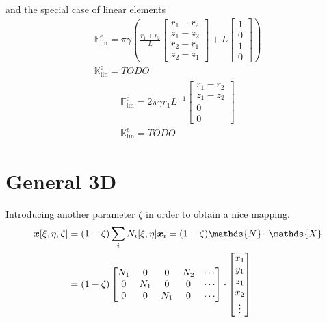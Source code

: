 \documentclass[a4paper,11pt]{article}
\renewcommand{\to}[1]{\text{\boldmath $#1$}} %
\newcommand{\uv}[1]{\mathds{#1}}
\newcommand{\um}[1]{\mathds{#1}}
\newcommand{\element}{\mathrm{e}}
\newcommand{\linear}{\mathrm{lin}}
\begin{document}
and the special case of linear elements
\begin{gather}
 \uv F^\element_\linear = \pi \gamma \left(\frac{r_1+r_2}{L}\begin{bmatrix}r_1-r_2\\z_1-z_2\\r_2-r_1\\z_2-z_1\end{bmatrix} + L\begin{bmatrix}1\\0\\1\\0\end{bmatrix}\right)\\
 \um K^\element_\linear = TODO
\end{gather}
\begin{gather}
 \uv F^\element_\linear = 2\pi \gamma r_1 L^{-1} \begin{bmatrix}r_1-r_2\\z_1-z_2\\0\\0\end{bmatrix}\\
 \um K^\element_\linear = TODO
\end{gather}


\section{General 3D}

Introducing another parameter $\zeta$ in order to obtain a nice mapping.
\begin{align}
 \to x[\xi,\eta,\zeta] &= (1-\zeta)\sum_i N_i[\xi,\eta]\to x_i = (1-\zeta) \um N \cdot \uv X\\
  &= (1-\zeta) \begin{bmatrix}N_1 & 0 & 0 & N_2 & \cdots\\0&N_1&0&0&\cdots\\0&0&N_1&0&\cdots\end{bmatrix}\cdot\begin{bmatrix}x_1\\y_1\\z_1\\x_2\\\vdots\end{bmatrix}
\end{align}
\end{document}
